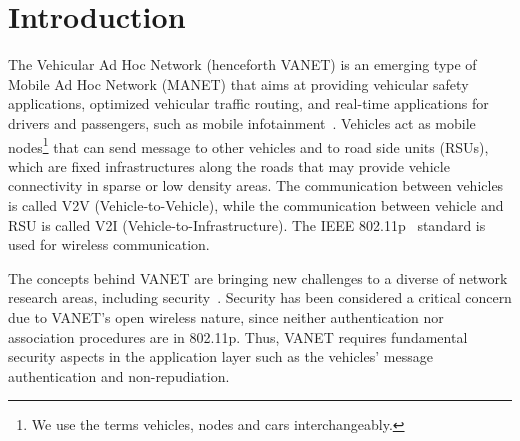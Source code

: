 \documentclass[preprint,12pt]{elsarticle}
\begin{document}
\section{Introduction}

The Vehicular Ad Hoc Network (henceforth VANET) is an emerging type of Mobile Ad Hoc Network (MANET) that aims at providing vehicular safety applications, optimized vehicular traffic routing, and real-time applications for drivers and passengers, such as mobile infotainment~\cite{al2013comprehensive}. Vehicles act as mobile nodes\footnote{We use the terms vehicles, nodes and cars interchangeably.} that can send message to other vehicles and to road side units (RSUs), which are fixed infrastructures along the roads that may provide vehicle connectivity in sparse or low density areas. The communication between vehicles is called V2V (Vehicle-to-Vehicle), while the communication between vehicle and RSU is called V2I (Vehicle-to-Infrastructure). The IEEE 802.11p~\cite{ieee11802} standard is used for wireless communication.


The concepts behind VANET are bringing new challenges to a diverse of network research areas, including security~\cite{gillani2013survey}. Security has been considered a critical concern due to VANET's open wireless nature, since neither authentication nor association procedures are in 802.11p. Thus, VANET requires fundamental security aspects in the application layer such as the vehicles' message authentication and non-repudiation.

\end{document}
